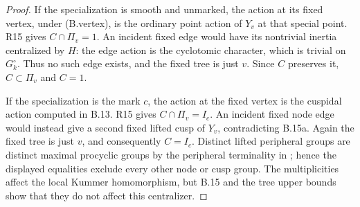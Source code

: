 \begin{proof}
If the specialization is smooth and unmarked, the action at its fixed
vertex, under (B.vertex), is the ordinary point action of $Y_v$ at that
special point. R15 gives $C\cap\Pi_v=1$. An incident fixed edge would
have its nontrivial inertia centralized by $H$: the edge action is the
cyclotomic character, which is trivial on $G_k^\circ$. Thus no such edge
exists, and the fixed tree is just $v$. Since $C$ preserves it,
$C\subset\Pi_v$ and $C=1$.

If the specialization is the mark $c$, the action at the fixed vertex
is the cuspidal action computed in B.13. R15 gives
$C\cap\Pi_v=I_c$. An incident fixed node edge would instead give a second
fixed lifted cusp of $Y_v$, contradicting B.15a. Again the fixed tree is
just $v$, and consequently $C=I_c$. Distinct lifted peripheral groups
are distinct maximal procyclic groups by the peripheral terminality in
\citet[Proposition 1.2]{BC_MochComb}; hence the displayed equalities
exclude every other node or cusp group. The multiplicities affect the
local Kummer homomorphism, but B.15 and the tree upper bounds show that
they do not affect this centralizer.
\end{proof}
